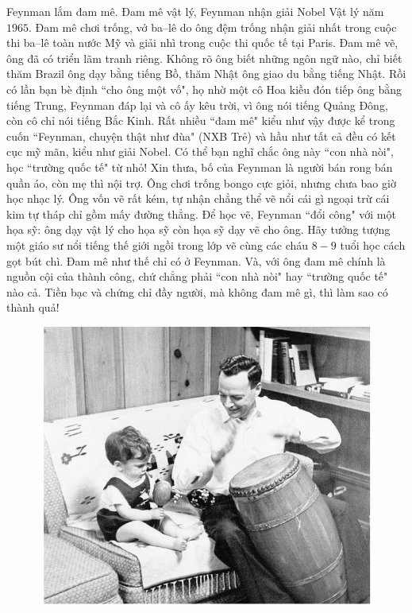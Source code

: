 \begin{multicols}{2}
	\vskip 0.1cm
	Feynman lắm đam mê. Đam mê vật lý, Feynman nhận giải Nobel Vật lý năm $1965$. Đam mê chơi trống, vở ba--lê do ông đệm trống nhận giải nhất trong cuộc thi ba--lê toàn nước Mỹ và giải nhì trong cuộc thi quốc tế tại Paris. Đam mê vẽ, ông đã có triển lãm tranh riêng. Không rõ ông biết những ngôn ngữ nào, chỉ biết thăm Brazil ông dạy bằng tiếng Bồ, thăm Nhật ông giao du bằng tiếng Nhật. Rồi có lần bạn bè định ``cho ông một vố", họ nhờ một cô Hoa kiều đón tiếp ông bằng tiếng Trung, Feynman đáp lại và cô ấy kêu trời, vì ông nói tiếng Quảng Đông, còn cô chỉ nói tiếng Bắc Kinh. Rất nhiều ``đam mê" kiểu như vậy được kể trong cuốn ``Feynman, chuyện thật như đùa" (NXB Trẻ) và hầu như tất cả đều có kết cục mỹ mãn, kiểu như giải Nobel. Có thể bạn nghĩ chắc ông này ``con nhà nòi", học ``trường quốc tế" từ nhỏ! Xin thưa, bố của Feynman là người bán rong bán quần áo, còn mẹ thì nội trợ. 
	\vskip 0.1cm
	Ông chơi trống bongo cực giỏi, nhưng chưa bao giờ học nhạc lý. Ông vốn vẽ rất kém, tự nhận chẳng thể vẽ nổi cái gì ngoại trừ cái kim tự tháp chỉ gồm mấy đường thẳng. Để học vẽ, Feynman ``đổi công" với một họa sỹ: ông dạy vật lý cho họa sỹ còn họa sỹ dạy vẽ cho ông. Hãy tưởng tượng một giáo sư nổi tiếng thế giới ngồi trong lớp vẽ cùng các cháu $8-9$ tuổi học cách gọt bút chì. Đam mê như thế chỉ có ở Feynman. Và, với ông đam mê chính là nguồn cội của thành công, chứ chẳng phải ``con nhà nòi" hay ``trường quốc tế" nào cả. Tiền bạc và chứng chỉ đầy người, mà không đam mê gì, thì làm sao có thành quả! 
	\begin{figure}[H]
		\vspace*{-5pt}
		\centering
		\captionsetup{labelformat= empty, justification=centering}
		\includegraphics[width= 1\linewidth]{2a}

\end{figure}
\end{multicols}

